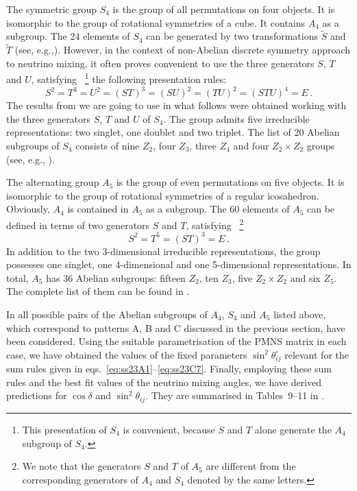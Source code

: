 \documentclass[11pt,a4paper]{article}
\newcommand{\be}{\begin{equation}}
\newcommand{\ee}{\end{equation}}
\def\th{\theta}
\numberwithin{equation}{section}
\begin{document}
 The symmetric group $S_4$ is the group of all permutations on four objects. 
It is isomorphic to the group of rotational symmetries of a cube. 
It contains $A_4$ as a subgroup. 
The 24 elements of $S_4$ can be 
generated by two transformations $\tilde S$ and $\tilde T$ 
(see, e.g.,\cite{Altarelli:2010gt,Ishimori:2010au}). 
However, in the context of non-Abelian discrete symmetry approach 
to neutrino mixing, it often 
proves convenient to use the three generators 
 $S$, $T$ and $U$, satisfying~%
\footnote{This presentation of $S_4$ is convenient, because 
$S$ and $T$ alone generate the $A_4$ subgroup of $S_4$.}
the following presentation rules:
\be
S^2 = T^3 = U^2 = (ST)^3 = (SU)^2 = (TU)^2 = (STU)^4 = E\,.
\ee
%
The results from \cite{Girardi:2015rwa} we are going to use in 
what follows were obtained working with the three generators $S$, $T$
and $U$ of $S_4$.   
The group admits five irreducible
representations: two singlet, one doublet 
and two triplet. The list of 20 Abelian subgroups of $S_4$ consists of 
nine $Z_2$, four $Z_3$, three $Z_4$ and four $Z_2\times Z_2$ groups 
(see, e.g., \cite{Tanimoto:2015nfa}).

 The alternating group $A_5$ is the group of even permutations on 
five objects. It is isomorphic to the group of rotational symmetries 
of a regular icosahedron. Obviously, $A_4$ is contained in $A_5$ as a subgroup.
The 60 elements of $A_5$ can be defined in terms of two generators 
$S$ and $T$, satisfying~%
\footnote{We note that the generators $S$ and $T$ of $A_5$ are different 
from the corresponding generators of $A_4$ and $S_4$ denoted by the same 
letters.}
\be
S^2 = T^5 = (ST)^3 = E\,.
\ee
%
In addition to the two 3-dimensional irreducible representations, the group 
possesses one singlet, one 4-dimensional and one 5-dimensional representations.
In total, $A_5$ has 36 Abelian subgroups: fifteen $Z_2$, ten $Z_3$, 
five $Z_2\times Z_2$ and six $Z_5$. The complete list of them 
can be found in \cite{Ding:2011cm}.

 In \cite{Girardi:2015rwa} all possible pairs of the 
Abelian subgroups of $A_4$, $S_4$ and $A_5$ listed above, 
which correspond to patterns A, B and C discussed in the previous section, 
have been considered. 
Using the suitable parametrisation of the PMNS matrix in each case, 
we have obtained the values of the fixed parameters $\sin^2\th^\circ_{ij}$  
relevant for the sum rules given in eqs.~\eqref{eq:ss23A1}--\eqref{eq:ss23C7}. 
Finally, employing these sum rules and the best fit values of the neutrino mixing angles, 
we have derived predictions for $\cos\delta$ and $\sin^2\th_{ij}$. 
They are summarised in Tables~9--11 in \cite{Girardi:2015rwa}.
\end{document}
